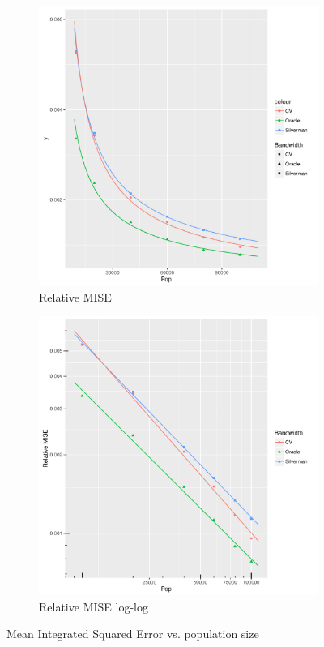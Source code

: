 \begin{figure}[htbp]
\begin{subfigure}[b]{0.3\textwidth}
    \includegraphics[width=\textwidth]{results/by_pop_size/RMISE-vs-population}
    \caption{Relative MISE}
    \end{subfigure}
    \begin{subfigure}[b]{0.3\textwidth}
    \includegraphics[width=\textwidth]{results/by_pop_size/RMISE-vs-population-log-log}
    \caption{Relative MISE log-log}
    \end{subfigure}
    \caption[MISE: by population size]{Mean Integrated Squared Error vs. population size}
    \label{fig:ise:unifNpop_1h}
\end{figure}



